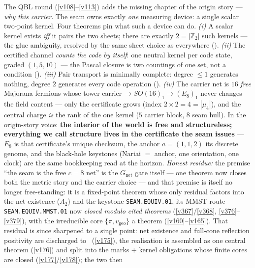 \documentclass[11pt,a4paper]{article}
\newcommand{\Z}{\mathbb Z}
\begin{document}
\begin{keybox}
The QBL round (\vref{v108}--\vref{v113}) adds the missing chapter of the origin story --- \emph{why this carrier}. The
seam owns exactly \emph{one} measuring device: a single scalar two-point kernel. Four theorems pin what
such a device can do. \emph{(i)} A scalar kernel exists \emph{iff} it pairs the two sheets; there are
exactly $2=|\Z_2|$ such kernels --- the glue ambiguity, resolved by the same sheet choice as everywhere
(). \emph{(ii)} The certified channel \emph{counts the code by itself}:
one neutral kernel per code state, graded $(1,5,10)$ --- the Pascal closure is two countings of one set,
not a condition (). \emph{(iii)} Pair transport is minimally
complete: degree $\le1$ generates nothing, degree $2$ generates every code operation
(). \emph{(iv)} The carrier net is $16$ \emph{free} Majorana
fermions whose tower carrier$\,\to SO(16)_1\to(E_8)_1$ never changes the field content --- only the
certificate grows (index $2{\times}2=4=|\mu_4|$), and the central charge \emph{is} the rank of the one
kernel ($5$ carrier block, $8$ seam hull). In the origin-story voice: \textbf{the interior of the world
is free and structureless; everything we call structure lives in the certificate the seam issues} ---
$E_8$ is that certificate's unique checksum, the anchor $a=(1,1,2)$ its discrete genome, and the
black-hole keystones (Nariai $=$ anchor, one orientation, one clock) are the same bookkeeping read at
the horizon. \emph{Honest residue:} the premise ``the seam is the free $c{=}8$ net'' is the
$G_{\mathrm{net}}$ gate itself --- one theorem now closes both the metric story and the carrier choice ---
and that premise is itself no longer free-standing: it is a fixed-point theorem whose only residual factors
into the net-existence ($A_2$) and the keystone \texttt{SEAM.EQUIV.01}, its MMST route \texttt{SEAM.EQUIV.MMST.01}
now \emph{closed modulo cited theorems}
(\vref{v367}/\vref{v368}, \vref{v376}--\vref{v379}), with the irreducible core
$\{\pi,v_{\mathrm{geo}}\}$ a theorem (\vref{v160}--\vref{v165}). That residual is since sharpened to a
single point: net existence and full-cone reflection positivity are discharged to \mE\
(\vref{v175}), the realisation is assembled as one central theorem (\vref{v176}) and split into the
marks $+$ kernel obligations whose finite cores are closed (\vref{v177}/\vref{v178}); the two then

\end{keybox}
\end{document}
